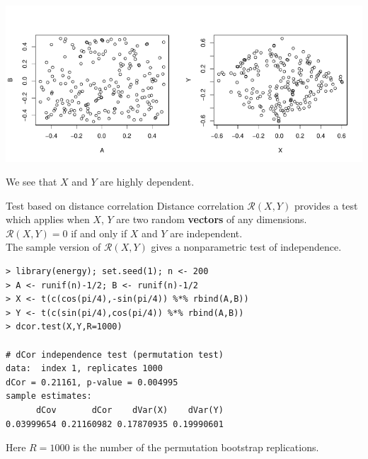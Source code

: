 \documentclass[11pt,handout,aspectratio=169,dvipsnames]{beamer}
\begin{document}
\begin{frame}{}
\begin{center}
	\includegraphics[width=0.5\textwidth]{pics/ABplot}\includegraphics[width=0.5\textwidth]{pics/XYplot}	
\end{center}
	We see that $X$ and $Y$ are highly dependent. 
\end{frame}

\begin{frame}[fragile,label=zerocor]{Test based on distance correlation}
\alert{Distance correlation} $\mathcal R(X,Y)$ provides a test which applies when 
$X$, $Y$ are two random \textbf{vectors} of any dimensions.\\[.2cm]
$\mathcal R(X,Y)=0$ if and only if $X$ and $Y$ are independent.\\[.2cm]
The sample version of $\mathcal R(X,Y)$ gives a \alert{nonparametric} test of independence. \\[.2cm]
\begin{lstlisting}
> library(energy); set.seed(1); n <- 200
> A <- runif(n)-1/2; B <- runif(n)-1/2
> X <- t(c(cos(pi/4),-sin(pi/4)) %*% rbind(A,B))
> Y <- t(c(sin(pi/4),cos(pi/4)) %*% rbind(A,B))
> dcor.test(X,Y,R=1000)

# dCor independence test (permutation test)
data:  index 1, replicates 1000
dCor = 0.21161, p-value = 0.004995
sample estimates:
      dCov       dCor    dVar(X)    dVar(Y) 
0.03999654 0.21160982 0.17870935 0.19990601 
\end{lstlisting}
Here $R=1000$ is the number of the permutation bootstrap replications.
\end{frame}
\end{document}
